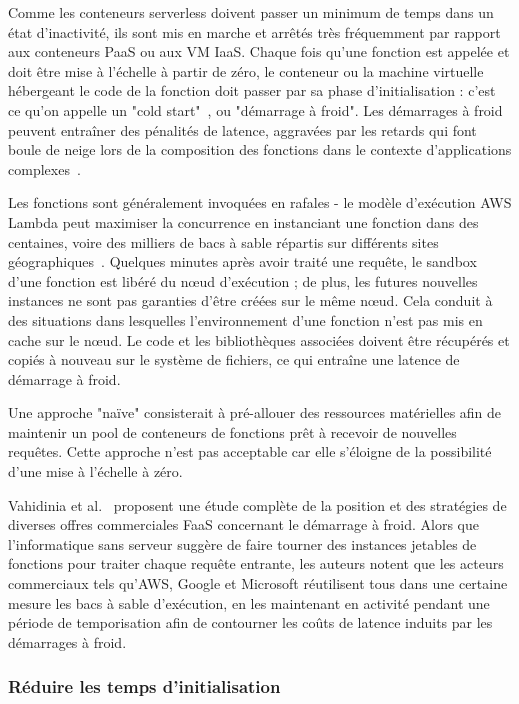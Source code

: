 Comme les conteneurs serverless doivent passer un minimum de temps dans un état d'inactivité, ils sont mis en marche et arrêtés très fréquemment par rapport aux conteneurs PaaS ou aux VM IaaS. Chaque fois qu'une fonction est appelée et doit être mise à l'échelle à partir de zéro, le conteneur ou la machine virtuelle hébergeant le code de la fonction doit passer par sa phase d'initialisation : c'est ce qu'on appelle un "cold start"~\cite{lloydImprovingApplicationMigration2018}, ou "démarrage à froid". Les démarrages à froid peuvent entraîner des pénalités de latence, aggravées par les retards qui font boule de neige lors de la composition des fonctions dans le contexte d'applications complexes~\cite{mohanAgileColdStartsa}.

Les fonctions sont généralement invoquées en rafales - le modèle d'exécution AWS Lambda peut maximiser la concurrence en instanciant une fonction dans des centaines, voire des milliers de bacs à sable répartis sur différents sites géographiques~\cite{aws-lambda-scaling}. Quelques minutes après avoir traité une requête, le sandbox d'une fonction est libéré du nœud d'exécution ; de plus, les futures nouvelles instances ne sont pas garanties d'être créées sur le même nœud. Cela conduit à des situations dans lesquelles l'environnement d'une fonction n'est pas mis en cache sur le nœud. Le code et les bibliothèques associées doivent être récupérés et copiés à nouveau sur le système de fichiers, ce qui entraîne une latence de démarrage à froid.

Une approche "naïve" consisterait à pré-allouer des ressources matérielles afin de maintenir un pool de conteneurs de fonctions prêt à recevoir de nouvelles requêtes. Cette approche n'est pas acceptable car elle s'éloigne de la possibilité d'une mise à l'échelle à zéro.

Vahidinia et al.~\cite{vahidiniaColdStartServerless2020} proposent une étude complète de la position et des stratégies de diverses offres commerciales FaaS concernant le démarrage à froid. Alors que l'informatique sans serveur suggère de faire tourner des instances jetables de fonctions pour traiter chaque requête entrante, les auteurs notent que les acteurs commerciaux tels qu'AWS, Google et Microsoft réutilisent tous dans une certaine mesure les bacs à sable d'exécution, en les maintenant en activité pendant une période de temporisation afin de contourner les coûts de latence induits par les démarrages à froid.

\subsubsection{Réduire les temps d'initialisation}

